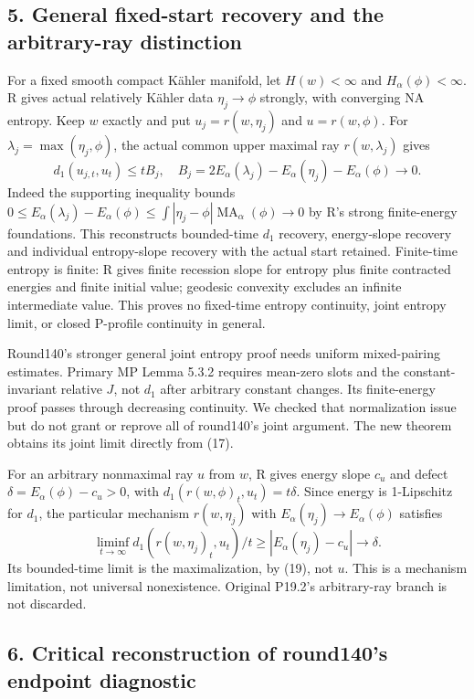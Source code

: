 \documentclass[
  11pt,
]{article}
\begin{document}
\subsection{5. General fixed-start recovery and the arbitrary-ray
distinction}\label{general-fixed-start-recovery-and-the-arbitrary-ray-distinction}

For a fixed smooth compact Kähler manifold, let \(H(w)<\infty\) and
\(H_\alpha(\phi)<\infty\). R gives actual relatively Kähler data
\(\eta_j\to\phi\) strongly, with converging NA entropy. Keep \(w\)
exactly and put \(u_j=r(w,\eta_j)\) and \(u=r(w,\phi)\). For
\(\lambda_j=\max(\eta_j,\phi)\), the actual common upper maximal ray
\(r(w,\lambda_j)\) gives \[
d_1(u_{j,t},u_t)\le t B_j,\quad
B_j=2E_\alpha(\lambda_j)-E_\alpha(\eta_j)-E_\alpha(\phi)\to0.
\tag{19}
\] Indeed the supporting inequality bounds
\(0\le E_\alpha(\lambda_j)-E_\alpha(\phi)
\le\int|\eta_j-\phi|\operatorname{MA}_\alpha(\phi)\to0\) by R's strong
finite-energy foundations. This reconstructs bounded-time \(d_1\)
recovery, energy-slope recovery and individual entropy-slope recovery
with the actual start retained. Finite-time entropy is finite: R gives
finite recession slope for entropy plus finite contracted energies and
finite initial value; geodesic convexity excludes an infinite
intermediate value. This proves no fixed-time entropy continuity, joint
entropy limit, or closed P-profile continuity in general.

Round140's stronger general joint entropy proof needs uniform
mixed-pairing estimates. Primary MP Lemma 5.3.2 requires mean-zero slots
and the constant-invariant relative \(J\), not \(d_1\) after arbitrary
constant changes. Its finite-energy proof passes through decreasing
continuity. We checked that normalization issue but do not grant or
reprove all of round140's joint argument. The new theorem obtains its
joint limit directly from (17).

For an arbitrary nonmaximal ray \(u\) from \(w\), R gives energy slope
\(c_u\) and defect \(\delta=E_\alpha(\phi)-c_u>0\), with
\(d_1(r(w,\phi)_t,u_t)=t\delta\). Since energy is 1-Lipschitz for
\(d_1\), the particular mechanism \(r(w,\eta_j)\) with
\(E_\alpha(\eta_j)\to E_\alpha(\phi)\) satisfies \[
\liminf_{t\to\infty}
 d_1(r(w,\eta_j)_t,u_t)/t
\ge |E_\alpha(\eta_j)-c_u|\longrightarrow\delta.
\tag{20}
\] Its bounded-time limit is the maximalization, by (19), not \(u\).
This is a mechanism limitation, not universal nonexistence. Original
P19.2's arbitrary-ray branch is not discarded.

\subsection{6. Critical reconstruction of round140's endpoint
diagnostic}\label{critical-reconstruction-of-round140s-endpoint-diagnostic}
\end{document}
